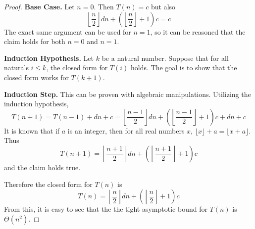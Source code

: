 \documentclass[11pt]{article}
\begin{document}
\begin{enumerate}
\begin{proof}
            \textbf{Base Case.} Let \(n=0\). Then \(T(n) = c\) but also
            \[
                \left\lfloor \frac{n}{2} \right\rfloor dn + \left( \left\lfloor \frac{n}{2} \right\rfloor + 1 \right) c = c
            \]
            The exact same argument can be used for \(n=1\), so it can be reasoned that the claim holds for both \(n=0\) and \(n=1\).

            \textbf{Induction Hypothesis.} Let \(k\) be a natural number. Suppose that for all naturals \(i \leq k\), the closed form for \(T(i)\) holds. The goal is to show that the closed form works for \(T(k+1)\).

            \textbf{Induction Step.} This can be proven with algebraic manipulations. Utilizing the induction hypothesis,
            \[
                T(n+1) = T(n-1) + dn + c = \left\lfloor \frac{n-1}{2} \right\rfloor dn + \left( \left\lfloor \frac{n-1}{2} \right\rfloor + 1 \right) c + dn + c
            \]
            It is known that if \(a\) is an integer, then for all real numbers \(x\), \(\lfloor x \rfloor + a = \lfloor x+a \rfloor\). Thus
            \[
                T(n+1) = \left\lfloor \frac{n+1}{2} \right\rfloor dn + \left( \left\lfloor \frac{n+1}{2} \right\rfloor + 1 \right) c
            \]
            and the claim holds true.

            Therefore the closed form for \(T(n)\) is
            \[
                T(n)=\left\lfloor \frac{n}{2} \right\rfloor dn + \left( \left\lfloor \frac{n}{2} \right\rfloor + 1 \right) c
            \]
            From this, it is easy to see that the the tight asymptotic bound for \(T(n)\) is \(\Theta(n^2)\).

        \end{proof}
    \end{enumerate}
\end{document}
